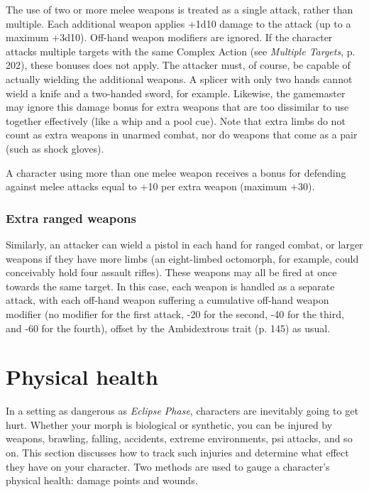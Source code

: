 The use of two or more melee weapons is treated as a single attack, rather than multiple. Each additional weapon applies +1d10 damage to the attack (up to a maximum +3d10). Off-hand weapon modifiers are ignored. If the character attacks multiple targets with the same Complex Action (see \emph{Multiple Targets}, p. 202), these bonuses does not apply. The attacker must, of course, be capable of actually wielding the additional weapons. A splicer with only two hands cannot wield a knife and a two-handed sword, for example. Likewise, the gamemaster may ignore this damage bonus for extra weapons that are too dissimilar to use together effectively (like a whip and a pool cue). Note that extra limbs do not count as extra weapons in unarmed combat, nor do weapons that come as a pair (such as shock gloves). 

A character using more than one melee weapon receives a bonus for defending against melee attacks equal to +10 per extra weapon (maximum +30). 

\subsubsection{Extra ranged weapons} 

Similarly, an attacker can wield a pistol in each hand for ranged combat, or larger weapons if they have more limbs (an eight-limbed octomorph, for example, could conceivably hold four assault rifles). These weapons may all be fired at once towards the same target. In this case, each weapon is handled as a separate attack, with each off-hand weapon suffering a cumulative off-hand weapon modifier (no modifier for the first attack, -20 for the second, -40 for the third, and -60 for the fourth), offset by the Ambidextrous trait (p. 145) as usual. 

\section{Physical health} \label{sec:physical-health} 

In a setting as dangerous as \emph{Eclipse Phase}, characters are inevitably going to get hurt. Whether your morph is biological or synthetic, you can be injured by weapons, brawling, falling, accidents, extreme environments, psi attacks, and so on. This section discusses how to track such injuries and determine what effect they have on your character. Two methods are used to gauge a character’s physical health: damage points and wounds. 

